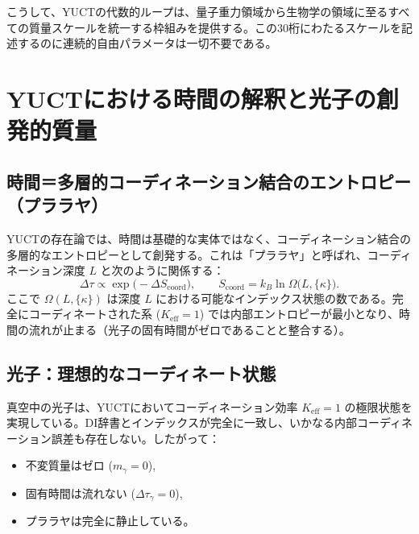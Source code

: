 \documentclass[12pt,a4paper]{article}
\begin{document}
	こうして、YUCTの代数的ループは、量子重力領域から生物学の領域に至るすべての質量スケールを統一する枠組みを提供する。この30桁にわたるスケールを記述するのに連続的自由パラメータは一切不要である。
	

\section{YUCTにおける時間の解釈と光子の創発的質量}
\label{sec:time_photon_ja}

\subsection{時間＝多層的コーディネーション結合のエントロピー（プララヤ）}

YUCTの存在論では、時間は基礎的な実体ではなく、コーディネーション結合の多層的なエントロピーとして創発する。これは「プララヤ」と呼ばれ、コーディネーション深度 \(L\) と次のように関係する：
\begin{equation}
	\Delta\tau \propto \exp\bigl(-\Delta S_{\mathrm{coord}}\bigr),\qquad
	S_{\mathrm{coord}} = k_B \ln\Omega\bigl(L,\{\kappa\}\bigr).
\end{equation}
ここで \(\Omega(L,\{\kappa\})\) は深度 \(L\) における可能なインデックス状態の数である。完全にコーディネートされた系 (\(K_{\mathrm{eff}}=1\)) では内部エントロピーが最小となり、時間の流れが止まる（光子の固有時間がゼロであることと整合する）。

\subsection{光子：理想的なコーディネート状態}

真空中の光子は、YUCTにおいてコーディネーション効率 \(K_{\mathrm{eff}}=1\) の極限状態を実現している。DI辞書とインデックスが完全に一致し、いかなる内部コーディネーション誤差も存在しない。したがって：
\begin{itemize}
	\item 不変質量はゼロ (\(m_\gamma=0\)),
	\item 固有時間は流れない (\(\Delta\tau_\gamma=0\)),
	\item プララヤは完全に静止している。
\end{itemize}
\end{document}
